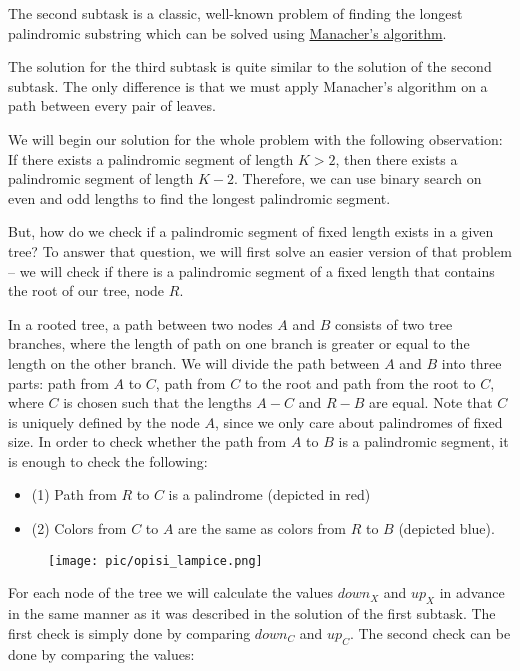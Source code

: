 \documentclass[a4paper]{article}
\begin{document}
\clearpage

The second subtask is a classic, well-known problem of finding the longest
palindromic substring which can be solved using
\href{https://en.wikipedia.org/wiki/Longest_palindromic_substring}{Manacher's
algorithm}.

The solution for the third subtask is quite similar to the solution of the
second subtask. The only difference is that we must apply Manacher's algorithm
on a path between every pair of leaves.

We will begin our solution for the whole problem with the following observation:
If there exists a palindromic segment of length $K > 2$, then there exists a
palindromic segment of length $K - 2$. Therefore, we can use binary search on
even and odd lengths to find the longest palindromic segment.

But, how do we check if a palindromic segment of fixed length exists in a
given tree? To answer that question, we will first solve an easier version
of that problem -- we will check if there is a palindromic segment of a fixed
length that contains the root of our tree, node $R$.

In a rooted tree, a path between two nodes $A$ and $B$ consists of two
tree branches, where the length of path on one branch is greater or equal
to the length on the other branch. We will divide the path between $A$ and
$B$ into three parts: path from $A$ to $C$, path from $C$ to the root and path
from the root to $C$, where $C$ is chosen such that the lengths $A-C$ and $R-B$
are equal. Note that $C$ is uniquely defined by the node $A$, since we only care
about palindromes of fixed size. In order to check whether the path from $A$ to
$B$ is a palindromic segment, it is enough to check the following:

\begin{itemize}
  \item (1) Path from $R$ to $C$ is a palindrome (depicted in red)
  \item (2) Colors from $C$ to $A$ are the same as colors from $R$
    to $B$ (depicted blue).
\end{itemize}

\begin{figure}[!htbp]
\centering
\texttt{[image: pic/opisi\_lampice.png]}
\end{figure}

For each node of the tree we will calculate the values $down_X$ and $up_X$ in
advance in the same manner as it was described in the solution of the first
subtask. The first check is simply done by comparing $down_C$ and $up_C$. The
second check can be done by comparing the values:
\end{document}
